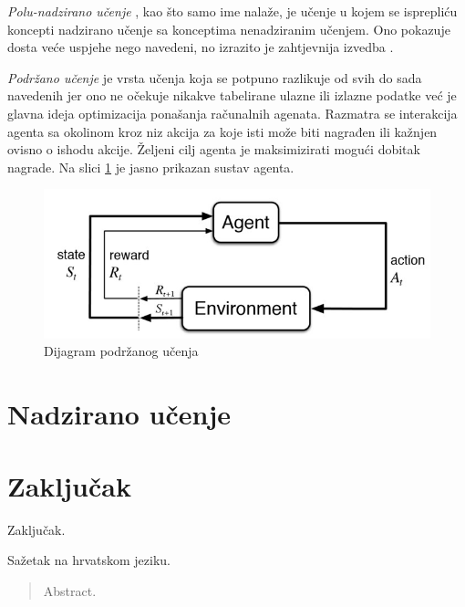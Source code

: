 \documentclass[times, utf8, zavrsni]{fer}
\begin{document}
\bigskip

\textit{Polu-nadzirano učenje} , kao što samo ime nalaže, je učenje u kojem se isprepliću koncepti nadzirano učenje sa konceptima nenadziranim učenjem. Ono pokazuje dosta veće uspjehe nego navedeni, no izrazito je zahtjevnija izvedba \citep{wiki:SEMISUP}.

\bigskip

\textit{Podržano učenje}  je vrsta učenja koja se potpuno razlikuje od svih do sada navedenih jer ono ne očekuje nikakve tabelirane ulazne ili izlazne podatke već je glavna ideja optimizacija ponašanja računalnih agenata. Razmatra se interakcija agenta sa okolinom  kroz niz akcija za koje isti može biti nagrađen ili kažnjen ovisno o ishodu akcije. Željeni cilj agenta je maksimizirati mogući dobitak nagrade. Na slici \ref{fig:reinforcement-learning} je jasno prikazan sustav agenta.

\begin{figure}[H]
    \centering
    \includegraphics[scale=0.7]{img/reinforcement-learning.jpg}
    \caption[Caption for LOF]{Dijagram podržanog učenja\footnotemark}
    \label{fig:reinforcement-learning}
\end{figure}

\chapter{Nadzirano učenje}

\chapter{Zaključak}
Zaključak.



\nocite{*}

\begin{sazetak}
Sažetak na hrvatskom jeziku.

\end{sazetak}

\begin{abstract}
Abstract.

\end{abstract}
\end{document}
